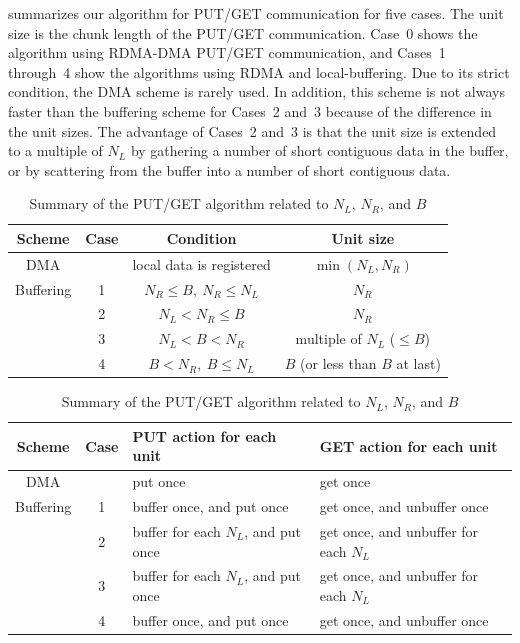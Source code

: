  summarizes our algorithm for PUT/GET communication for five cases.
The unit size is the chunk length of the PUT/GET communication.
Case~0 shows the algorithm using RDMA-DMA PUT/GET communication, and Cases~1 through~4 show the algorithms using RDMA and local-buffering. 
Due to its strict condition, the DMA scheme is rarely used.
In addition, this scheme is not always faster than the buffering scheme for Cases~2 and~3 because of the difference in the unit sizes. The advantage of Cases~2 and~3 is that the unit size 
is extended to a multiple of $N_L$ by gathering a number of short contiguous data in the buffer,
or by scattering from the buffer into a number of short contiguous data.

\begin{table}[tbh]
 \caption{Summary of the PUT/GET algorithm related to $N_L$, $N_R$, and $B$}
 \label{tab:putget}
 \begin{flushleft}
  \begin{tabular}{|@{~}c@{~}|c||@{~}c@{~}|@{~}c@{~}|}
\hline
Scheme &
Case &
Condition &
Unit size \\
\hline
\hline
DMA &
&
local data is registered &
$\min(N_L, N_R)$ \\
\hline
Buffering &
1 & 
$N_R \leq B,~ N_R \leq N_L$ &
$N_R$ \\
\cline{2-4}
&
2 &
$N_L < N_R \leq B$ &
$N_R$ \\
\cline{2-4}
&
3 &
$N_L < B < N_R$ &
multiple of $N_L$ ($\leq B$) \\
\cline{2-4}
&
4 &
$B < N_R,~ B \leq N_L$ &
$B$ (or less than $B$ at last) \\
\hline
  \end{tabular}
 \end{flushleft}
 \begin{flushleft}
  \begin{tabular}{|@{~}c@{~}|c||@{~~}l@{~~}|@{~~}l@{~~}|}
\hline
Scheme &
Case &
PUT action for each unit &
GET action for each unit \\
\hline
\hline
DMA &
&
put once &
get once \\
\hline
Buffering &
1 &
buffer once, and put once &
get once, and unbuffer once \\
\cline{2-4}
&
2 &
buffer for each $N_L$, and put once &
get once, and unbuffer for each $N_L$ \\
\cline{2-4}
&
3 &
buffer for each $N_L$, and put once &
get once, and unbuffer for each $N_L$ \\
\cline{2-4}
&
4 &
buffer once, and put once &
get once, and unbuffer once \\
\hline
  \end{tabular}
 \end{flushleft}
\end{table}


